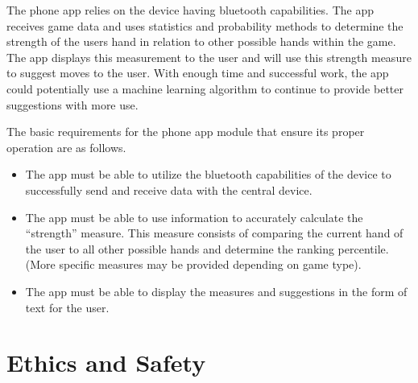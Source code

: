 \documentclass[12pt]{article}
\begin{document}
The phone app relies on the device having bluetooth capabilities. The app receives game data and uses statistics and probability methods to determine the strength of the users hand in relation to other possible hands within the game. The app displays this measurement to the user and will use this strength measure to suggest moves to the user. With enough time and successful work, the app could potentially use a machine learning algorithm to continue to provide better suggestions with more use. 

The basic requirements for the phone app module that ensure its proper operation are as follows.

\begin{itemize}
\item The app must be able to utilize the bluetooth capabilities of the device to successfully send and receive data with the central device.
\item The app must be able to use information to accurately calculate the ``strength'' measure. This measure consists of comparing the current hand of the user to all other possible hands and determine the ranking percentile. (More specific measures may be provided depending on game type).
\item The app must be able to display the measures and suggestions in the form of text for the user.
\end{itemize}

\section{Ethics and Safety}

\cite{IEEE_ethics}




\end{document}
